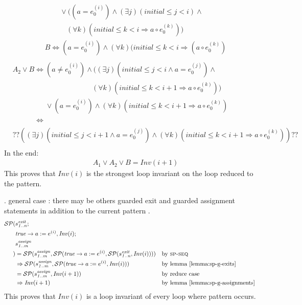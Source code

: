 \documentclass[a4paper,10pt]{article}
\newcommand{\idx}{\ensuremath{i}\xspace}
\newcommand{\idxinitial}{\ensuremath{\mathit{initial}}\xspace}
\newcommand{\at}[1]{{(#1)}}
\newcommand{\impl}{\ensuremath{\Longrightarrow}}
\newcommand{\Inv}[1]{\ensuremath{\mathit{Inv}(#1)\xspace}}
\newcommand{\gstatement}[2]{\ensuremath{s^{\mathit{#1}}_{\mathit{#2}}\xspace}}
\newcommand{\spseq}{\textsc{sp-seq}\xspace}
\newenvironment{proof}[1][Proof.]{\begin{trivlist}
\item[\hskip \labelsep {\bfseries #1}]}{\end{trivlist}}
\begin{document}
\begin{proof}
\begin{align*}
    &\phantom{B=} 
       \lor ((a = e_0^\at{\idx}) \land (\exists j)(\idxinitial \leq j < \idx ) \land \\
    &\phantom{B=(a} 
       (\forall k)(\idxinitial \leq k < \idx \impl a \circ e_0^\at{k})) \\
    &B\Leftrightarrow (a = e_0^\at{\idx})  \land (\forall k)(\idxinitial \leq k < \idx \impl (a \circ e_0^\at{k}) \\
  \end{align*}
  \begin{align*}
   &A_2 \lor B \Leftrightarrow (a \neq e_0^\at{\idx}) \land ((\exists j)(\idxinitial \leq j < \idx \land a = e_0^\at{j}) \land \\
   &\phantom {A_2 \lor B \Leftrightarrow (A_2 \land a \neq e_0^\at{\idx}}
     (\forall k)(\idxinitial \leq k < \idx+1 \impl a \circ e_0^\at{k})) \\ 
   &\phantom {A_2 \lor B \Leftrightarrow} 
      \lor (a = e_0^\at{\idx}) \land (\forall k)(\idxinitial \leq k < \idx+1 \impl a \circ e_0^\at{k}) \\ 
   &\phantom {A_2 \lor B}
   \Leftrightarrow\\
   &??((\exists j)(\idxinitial \leq j < \idx+1 \land a = e_0^\at{j}) \land (\forall k)(\idxinitial \leq k < \idx+1 \impl a \circ e_0^\at{k}))??\\ 
  \end{align*}
  In the end:
  \begin{align*}
    &A_1 \lor A_2 \lor B = \Inv{\idx+1} 
  \end{align*}
  This proves that \Inv{\idx} is the strongest loop invariant on the 
  loop reduced to the pattern. 

. general case : there may be others guarded exit and guarded assignment statements
                  in addition to the current pattern \curpattern.\\
  \begin{align*}
    \spost{
      &\gstatement{exit}{1..n};\\
      &\mathit{true} \rightarrow a := e^\at{\idx}}{\Inv{\idx};\\
      &\gstatement{assign}{1..m}\\
    }
    &= \spost{\gstatement{assign}{1..m}}{\spost{\mathit{true} \rightarrow a := e^\at{\idx}}
        {\spost{\gstatement{exit}{1..n}}{\Inv{\idx}}}} && \text{by \spseq} \\ 
    &\Rightarrow \spost{\gstatement{assign}{1..m}}
        {\spost{\mathit{true} \rightarrow a := e^\at{\idx}}{\Inv{\idx}}} && \text{by lemma \ref{lemma:sp-g-exits}} \\ 
    &= \spost{\gstatement{assign}{1..m}}{\Inv{\idx+1}} && \text{by reduce case} \\ 
    &\Rightarrow \Inv{\idx+1} && \text{by lemma \ref{lemma:sp-g-assignments}}
  \end{align*}
  This proves that \Inv{\idx} is a loop invariant of every loop where pattern
  \curpattern occurs.
\end{proof}
\end{document}
